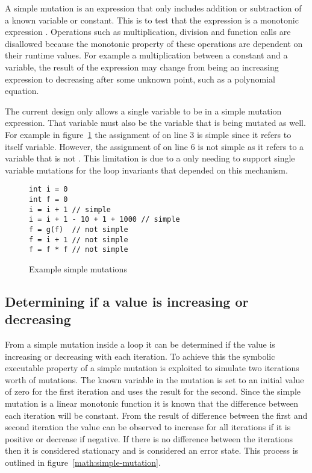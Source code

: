 A simple mutation is an expression that only includes addition or subtraction
of a known variable or constant.
This is to test that the expression is a monotonic expression \cite{tanton2005encyclopedia}.
Operations such as multiplication, division and function calls are disallowed
because the monotonic property of these operations are dependent on their
runtime values.
For example a multiplication between a constant and a variable,
the result of the expression may change from being an increasing expression
to decreasing after some unknown point, such as a polynomial equation.

The current design only allows a single variable to be in a simple mutation
expression.
That variable must also be the variable that is being mutated as well.
For example in figure~\ref{lst:simple-mutations} the assignment of  on
line 3 is simple since it refers to itself variable.
However, the assignment of  on line 6 is not simple as
it refers to a variable that is not .
This limitation is due to a only needing to 
support single variable mutations for the loop invariants
that depended on this mechanism.

\begin{figure}[ht]
\begin{lstlisting}
int i = 0
int f = 0
i = i + 1 // simple
i = i + 1 - 10 + 1 + 1000 // simple
f = g(f)  // not simple
f = i + 1 // not simple
f = f * f // not simple
\end{lstlisting}
\caption{Example simple mutations}
\label{lst:simple-mutations}
\end{figure}

\subsection{Determining if a value is increasing or decreasing}\label{s:sequence-dir}


From a simple mutation inside a loop it can be determined if the value is
increasing or decreasing with each iteration.
To achieve this the symbolic executable property of a simple mutation is
exploited to simulate two iterations worth of mutations.
The known variable in the mutation is set to an initial value of zero for
the first iteration and uses the result for the second.
Since the simple mutation is a linear monotonic function it is known that
the difference between each iteration will be constant.
From the result of difference between the first and second iteration the
value can be observed to increase for all iterations if it is positive or
decrease if negative. If there is no difference between the iterations then
it is considered stationary and is considered an error state.
This process is outlined in figure~\ref{math:simple-mutation}.

